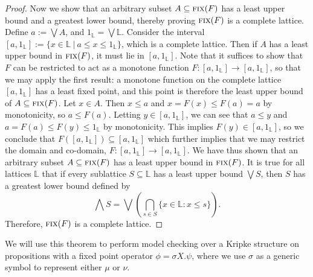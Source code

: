 \begin{proof}
    Now we show that an arbitrary subset $A \subseteq \textsc{fix}(F)$ has a least upper bound and a greatest lower bound, thereby proving $\textsc{fix}(F)$ is a complete lattice.
    Define $a:=\bigvee A$, and $1_\mathbb{L} = \bigvee \mathbb{L}$.
    Consider the interval $[a,1_\mathbb{L}] := \{ x \in \mathbb{L} \ \vert \ a \leq x \leq 1_\mathbb{L} \}$, which is a complete lattice.
    Then if $A$ has a least upper bound in $\textsc{fix}(F)$, it must lie in $[a,1_\mathbb{L}]$.
    Note that it suffices to show that $F$ can be restricted to act as a monotone function
    $F:[a,1_\mathbb{L}] \to [a,1_\mathbb{L}]$, so that we may apply the first result: a monotone function on the complete lattice $[a,1_\mathbb{L}]$ has a least fixed point, and this point is therefore the least upper bound of $A \subseteq \textsc{fix}(F)$.
    Let $x \in A$. Then $x \leq a$ and $x = F(x) \leq F(a) = a$ by monotonicity, so $a \leq F(a)$.
    Letting $y \in [a,1_\mathbb{L}]$, we can see that $a \leq y$ and $a = F(a) \leq F(y) \leq 1_\mathbb{L}$ by monotonicity.
    This implies $F(y) \in [a,1_\mathbb{L}]$, so we conclude that $F([a,1_\mathbb{L}]) \subseteq [a,1_\mathbb{L}]$ which further implies that we may restrict the domain and co-domain, $F: [a,1_\mathbb{L}] \to [a,1_\mathbb{L}]$.
    We have thus shown that an arbitrary subset $A \subseteq \textsc{fix}(F)$ has a least upper bound in $\textsc{fix}(F)$. It is true for all lattices $\mathbb{L}$ that if every sublattice $S \subseteq \mathbb{L}$ has a least upper bound $\bigvee S$, then $S$ has a greatest lower bound defined by
    \[\bigwedge S = \bigvee \left( \bigcap\limits_{s \in S} \{ x \in \mathbb{L}: x \leq s \} \right).\]
    Therefore, $\textsc{fix}(F)$ is a complete lattice.
\end{proof}

We will use this theorem to perform model checking over a Kripke structure on propositions with a fixed point operator $\phi = \sigma X.\psi$, where we use $\sigma$ as a generic symbol to represent either $\mu$ or $\nu$.

